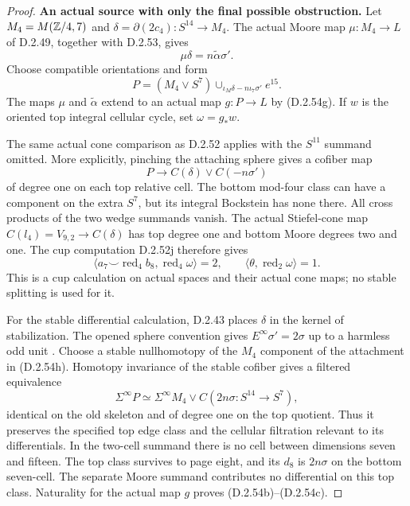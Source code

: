 \begin{proof}
\textbf{An actual source with only the final possible obstruction.}
Let $M_4=M(\mathbb Z/4,7)$ and
$\delta=\partial(2c_4):S^{14}\to M_4$.
The actual Moore map $\mu:M_4\to L$ of D.2.49,
together with D.2.53, gives
\[
                         \mu\delta=n\widetilde\alpha\sigma'.
                         \tag{D.2.54g}
\]
Choose compatible orientations and form
\[
 P=(M_4\vee S^7)\cup_{\iota_M\delta-n\iota_7\sigma'}e^{15}.
 \tag{D.2.54h}
\]
The maps $\mu$ and $\widetilde\alpha$ extend to an actual
map $g:P\to L$ by \textup{(D.2.54g)}.  If $w$ is the
oriented top integral cellular cycle, set $\omega=g_*w$.

The same actual cone comparison as D.2.52 applies with
the $S^{11}$ summand omitted.  More explicitly, pinching
the attaching sphere gives a cofiber map
\[
                     P\longrightarrow C(\delta)\vee C(-n\sigma')
                     \tag{D.2.54i}
\]
of degree one on each top relative cell.  The bottom
mod-four class can have a component on the extra $S^7$,
but its integral Bockstein has none there.  All cross
products of the two wedge summands vanish.  The actual
Stiefel-cone map $C(l_4)=V_{9,2}\to C(\delta)$ has top
degree one and bottom Moore degrees two and one.
The cup computation D.2.52j therefore gives
\[
 \langle a_7\smile\operatorname{red}_4b_8,
                  \operatorname{red}_4\omega\rangle=2,
 \qquad
 \langle\theta,\operatorname{red}_2\omega\rangle=1.
 \tag{D.2.54j}
\]
This is a cup calculation on actual spaces and their
actual cone maps; no stable splitting is used for it.

For the stable differential calculation, D.2.43 places
$\delta$ in the kernel of stabilization.  The opened
sphere convention gives $E^\infty\sigma'=2\sigma$
up to a harmless odd unit
\cite[introduction, p.~515]{EH5MorisugiMukai2000}.
Choose a stable nullhomotopy of the $M_4$ component of
the attachment in \textup{(D.2.54h)}.  Homotopy invariance
of the stable cofiber gives a filtered equivalence
\[
 \Sigma^\infty P\simeq
 \Sigma^\infty M_4\vee C(2n\sigma:S^{14}\to S^7),
 \tag{D.2.54k}
\]
identical on the old skeleton and of degree one on the
top quotient.  Thus it preserves the specified top edge
class and the cellular filtration relevant to its
differentials.  In the two-cell summand there is no cell
between dimensions seven and fifteen.  The top class
survives to page eight, and its $d_8$ is $2n\sigma$ on
the bottom seven-cell.  The separate Moore summand
contributes no differential on this top class.
Naturality for the actual map $g$ proves
\textup{(D.2.54b)--(D.2.54c)}.


\end{proof}
